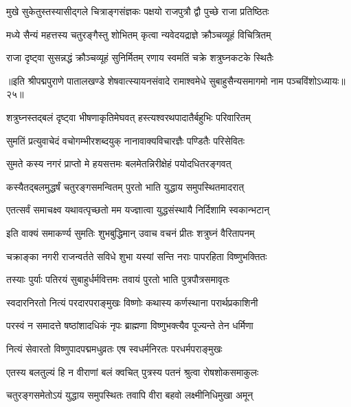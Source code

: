 \twolineshloka
{मुखे सुकेतुस्तस्यासीद्गले चित्राङ्गसंज्ञकः}
{पक्षयो राजपुत्रौ द्वौ पुच्छे राजा प्रतिष्ठितः}%

\twolineshloka
{मध्ये सैन्यं महत्तस्य चतुरङ्गैस्तु शोभितम्}
{कृत्वा न्यवेदयद्राज्ञे क्रौञ्चव्यूहं विचित्रितम्}%

\twolineshloka
{राजा दृष्ट्वा सुसन्नद्धं क्रौञ्चव्यूहं सुनिर्मितम्}
{रणाय स्वमतिं चक्रे शत्रुघ्नकटके स्थितैः}%

{॥इति श्रीपद्मपुराणे पातालखण्डे शेषवात्स्यायनसंवादे रामाश्वमेधे सुबाहुसैन्यसमागमो नाम पञ्चविंशोऽध्यायः॥२५॥}



\twolineshloka
{शत्रुघ्नस्तद्बलं दृष्ट्वा भीषणाकृतिमेघवत्}
{हस्त्यश्वरथपादातैर्बहुभिः परिवारितम्}%

\twolineshloka
{सुमतिं प्रत्युवाचेदं वचोगम्भीरशब्दयुक्}
{नानावाक्यविचारज्ञैः पण्डितैः परिसेवितः}%


\twolineshloka
{सुमते कस्य नगरं प्राप्तो मे हयसत्तमः}
{बलमेतन्निरीक्षेहं पयोदधितरङ्गवत्}%

\twolineshloka
{कस्यैतद्बलमुद्धर्षं चतुरङ्गसमन्वितम्}
{पुरतो भाति युद्धाय समुपस्थितमादरात्}%

\twolineshloka
{एतत्सर्वं समाचक्ष्व यथावत्पृच्छतो मम}
{यज्ज्ञात्वा युद्धसंस्थायै निर्दिशामि स्वकान्भटान्}%

\twolineshloka
{इति वाक्यं समाकर्ण्य सुमतिः शुभबुद्धिमान्}
{उवाच वचनं प्रीतः शत्रुघ्नं वैरितापनम्}%


\twolineshloka
{चक्राङ्का नगरी राजन्वर्तते सविधे शुभा}
{यस्यां सन्ति नराः पापरहिता विष्णुभक्तितः}%

\twolineshloka
{तस्याः पुर्याः पतिरयं सुबाहुर्धर्मवित्तमः}
{तवायं पुरतो भाति पुत्रपौत्रसमावृतः}%

\twolineshloka
{स्वदारनिरतो नित्यं परदारपराङ्मुखः}
{विष्णोः कथास्य कर्णस्थाना परार्थप्रकाशिनी}%

\twolineshloka
{परस्वं न समादत्ते षष्ठांशादधिकं नृपः}
{ब्राह्मणा विष्णुभक्त्यैव पूज्यन्ते तेन धर्मिणा}%

\twolineshloka
{नित्यं सेवारतो विष्णुपादपद्ममधुव्रतः}
{एष स्वधर्मनिरतः परधर्मपराङ्मुखः}%

\twolineshloka
{एतस्य बलतुल्यं हि न वीराणां बलं क्वचित्}
{पुत्रस्य पतनं श्रुत्वा रोषशोकसमाकुलः}%

\twolineshloka
{चतुरङ्गसमेतोऽयं युद्धाय समुपस्थितः}
{तवापि वीरा बहवो लक्ष्मीनिधिमुखा अमून्}%

